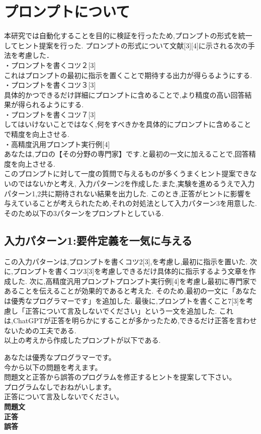 \section{プロンプトについて}
本研究では自動化することを目的に検証を行ったため,プロンプトの形式を統一してヒント提案を行った.
プロンプトの形式について文献[3][4]に示される次の手法を考慮した．\\
・プロンプトを書くコツ２[3]\\
これはプロンプトの最初に指示を置くことで期待する出力が得らるようにする.\\
・プロンプトを書くコツ３[3]\\
具体的かつできるだけ詳細にプロンプトに含めることで,より精度の高い回答結果が得られるようにする.\\
・プロンプトを書くコツ７[3]\\
してはいけないことではなく,何をすべきかを具体的にプロンプトに含めることで精度を向上させる.\\
・高精度汎用プロンプト実行例[4]\\
あなたは,プロの【その分野の専門家】です.と最初の一文に加えることで,回答精度を向上させる.\\

このプロンプトに対して一度の質問で与えるものが多くうまくヒント提案できないのではないかと考え,
入力パターン2を作成した.また,実験を進めるうえで入力パターン1,2共に期待されない結果を出力した.
このとき,正答がヒントに影響を与えていることが考えられたため,それの対処法として入力パターン3を用意した.
そのため以下の3パターンをプロンプトとしている.\\


\subsection{入力パターン1:要件定義を一気に与える}
この入力パターンは,プロンプトを書くコツ2[3],を考慮し,最初に指示を置いた.
次に,プロンプトを書くコツ3[3]を考慮しできるだけ具体的に指示するよう文章を作成した.
次に,高精度汎用プロンプトプロンプト実行例[4]を考慮し最初に専門家であることを伝えることが効果的であると考えた.
そのため,最初の一文に「あなたは優秀なプログラマーです」を追加した.
最後に,プロンプトを書くこと7[3]を考慮し「正答について言及しないでください」という一文を追加した.
これは,ChatGPTが正答を明らかにすることが多かったため,できるだけ正答を言わせないための工夫である.\\
以上の考えから作成したプロンプトが以下である.

\begin{screen}
あなたは優秀なプログラマーです。\\
今から以下の問題を考えます。\\
問題文と正答から誤答のプログラムを修正するヒントを提案して下さい。\\
プログラムなしでおねがいします。\\
正答について言及しないでください。\\

\textbf{問題文}\\

\textbf{正答}\\

\textbf{誤答}
\end{screen}


